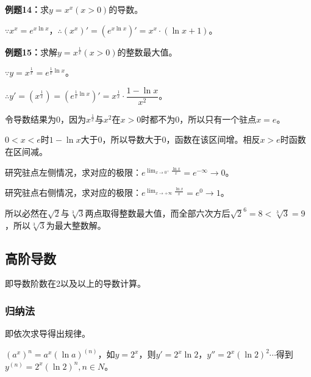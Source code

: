 \documentclass[UTF8, 12pt]{ctexart}
\begin{document}
\textbf{例题14：}求$y=x^x(x>0)$的导数。

$\because x^x=e^{x\ln x}$，$\therefore (x^x)'=(e^{x\ln x})'=x^x\cdot(\ln x+1)$。

\textbf{例题15：}求解$y=x^{\frac{1}{x}}(x>0)$的整数最大值。

$\because y=x^{\frac{1}{x}}=e^{\frac{1}{x}\ln x}$。

$\therefore y'=\left(x^{\frac{1}{x}}\right)=\left(e^{\frac{1}{x}\ln x}\right)'=x^{\frac{1}{x}}\cdot\dfrac{1-\ln x}{x^2}$。

令导数结果为0，因为$x^{\frac{1}{x}}$与$x^2$在$x>0$时都不为0，所以只有一个驻点$x=e$。

$0<x<e$时$1-\ln x$大于0，所以导数大于0，函数在该区间增。相反$x>e$时函数在区间减。

研究驻点左侧情况，求对应的极限：$e^{\lim_{x\to 0^+}\frac{\ln x}{x}}=e^{-\infty}\to 0$。

研究驻点右侧情况，求对应的极限：$e^{\lim_{x\to+\infty}\frac{\ln x}{x}}=e^0\to 1$。


所以必然在$\sqrt{2}$与$\sqrt[3]{3}$两点取得整数最大值，而全部六次方后$\sqrt{2}^6=8<\sqrt[3]{3}=9$，所以$\sqrt[3]{3}$为最大整数解。

\subsection{高阶导数}

即导数阶数在2以及以上的导数计算。

\subsubsection{归纳法}

即依次求导得出规律。

$(a^x)^n=a^x(\ln a)^{(n)}$，如$y=2^x$，则$y'=2^x\ln 2$，$y''=2^x(\ln 2)^2\cdots$得到$y^{(n)}=2^x(\ln 2)^n,n\in N$。
\end{document}
